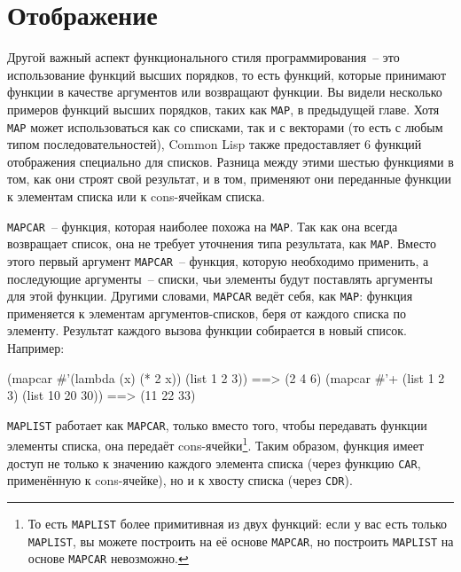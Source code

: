 \section{Отображение}
\label{sec:12-map}

Другой важный аспект функционального стиля программирования~-- это использование функций
высших порядков, то есть функций, которые принимают функции в качестве аргументов или
возвращают функции. Вы видели несколько примеров функций высших порядков, таких как
\lstinline{MAP}, в предыдущей главе. Хотя \lstinline{MAP} может использоваться как со списками, так
и с векторами (то есть с любым типом последовательностей), Common Lisp также предоставляет 6
функций отображения специально для списков. Разница между этими шестью функциями в том, как
они строят свой результат, и в том, применяют они переданные функции к элементам списка
или к cons-ячейкам списка.

\lstinline{MAPCAR}~-- функция, которая наиболее похожа на \lstinline{MAP}. Так как она всегда возвращает список,
она не требует уточнения типа результата, как \lstinline{MAP}. Вместо этого первый аргумент
\lstinline{MAPCAR}~-- функция, которую необходимо применить, а последующие аргументы~-- списки,
чьи элементы будут поставлять аргументы для этой функции. Другими словами, \lstinline{MAPCAR}
ведёт себя, как \lstinline{MAP}: функция применяется к элементам аргументов-списков, беря от
каждого списка по элементу. Результат каждого вызова функции собирается в новый
список. Например:

\begin{myverb}
(mapcar #'(lambda (x) (* 2 x)) (list 1 2 3)) ==> (2 4 6)
(mapcar #'+ (list 1 2 3) (list 10 20 30))    ==> (11 22 33)
\end{myverb}

\lstinline{MAPLIST} работает как \lstinline{MAPCAR}, только вместо того, чтобы передавать функции
элементы списка, она передаёт cons-ячейки\footnote{То есть \lstinline{MAPLIST} более примитивная
  из двух функций: если у вас есть только \lstinline{MAPLIST}, вы можете построить на её основе
  \lstinline{MAPCAR}, но построить \lstinline{MAPLIST} на основе \lstinline{MAPCAR} невозможно.}.  Таким
образом, функция имеет доступ не только к значению каждого элемента списка (через функцию
\lstinline{CAR}, применённую к cons-ячейке), но и к хвосту списка (через \lstinline{CDR}).

